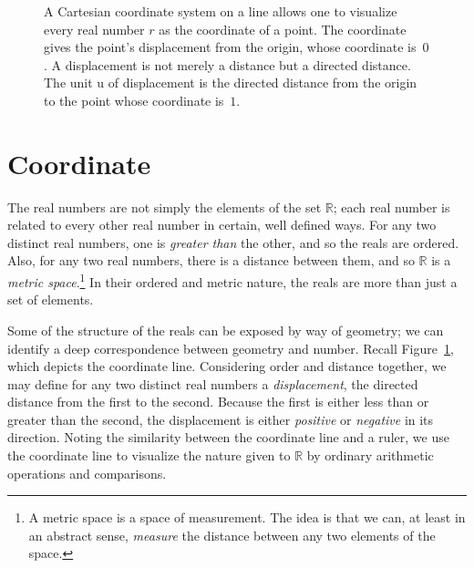 \begin{figure}
   \begin{center}
\end{center}
   \caption{A Cartesian coordinate system on a line allows one to visualize
      every real number $r$ as the coordinate of a point. The coordinate gives
      the point's displacement from the origin, whose coordinate is~$0$. A
      displacement is not merely a distance but a directed distance. The unit
      $\mathrm{u}$ of displacement is the directed distance from the origin to
      the point whose coordinate is~$1$.%
   }
\label{fig:number-line}
\end{figure}

\section{Coordinate}

The real numbers are not simply the elements of the set $\mathbb{R}$; each real
number is related to every other real number in certain, well defined ways. For
any two distinct real numbers, one is \emph{greater than} the other, and so the
reals are ordered.  Also, for any two real numbers, there is a distance between
them, and so $\mathbb{R}$ is a \emph{metric space}.\footnote{%
   A metric space is a space of measurement. The idea is that we can, at least
   in an abstract sense, \emph{measure} the distance between any two elements
   of the space.%
}
In their ordered and metric nature, the reals are more than just a set of
elements.

Some of the structure of the reals can be exposed by way of geometry; we can
identify a deep correspondence between geometry and number.  Recall
Figure~\ref{fig:number-line}, which depicts the coordinate line.  Considering
order and distance together, we may define for any two distinct real numbers a
\emph{displacement}, the directed distance from the first to the second.
Because the first is either less than or greater than the second, the
displacement is either \emph{positive} or \emph{negative} in its direction.
Noting the similarity between the coordinate line and a ruler, we use the
coordinate line to visualize the nature given to $\mathbb{R}$ by ordinary
arithmetic operations and comparisons.


